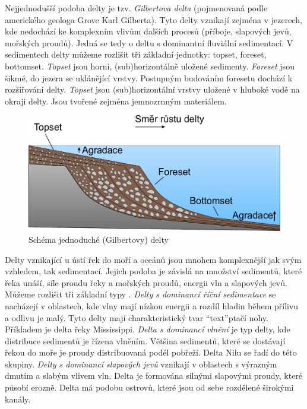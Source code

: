 Nejjednodušší podoba delty je tzv. \emph{Gilbertova delta} (pojmenovaná podle amerického geologa Grove Karl Gilberta). Tyto delty vznikají zejména v jezerech, kde nedochází ke komplexním vlivům dalších procesů (příboje, slapových jevů, mořských proudů). Jedná se tedy o deltu s dominantní fluviální sedimentací. V sedimentech delty můžeme rozlišit tři základní jednotky: topset, foreset, bottomset. \emph{Topset} jsou horní, (sub)horizontálně uložené sedimenty. \emph{Foreset} jsou šikmé, do jezera se uklánějící vrstvy. Postupným budováním foresetu dochází k rozšiřování delty. \emph{Topset} jsou (sub)horizontální vrstvy uložené v hluboké vodě na okraji delty. Jsou tvořené zejména jemnozrnným materiálem.

\begin{figure}[h]
	\centering
	\includegraphics[width=1\linewidth]{obrazky/fluvial/gilbert_delta}
	\caption{Schéma jednoduché (Gilbertovy) delty}
	\label{fig:gilbertdelta}
\end{figure}

Delty vznikající u ústí řek do moří a oceánů jsou mnohem komplexnější jak svým vzhledem, tak sedimentací. Jejich podoba je závislá na množství sedimentů, které řeka unáší, síle proudu řeky a mořských proudů, energii vln a slapových jevů. Můžeme rozlišit tři základní typy \parencite{boggsPrinciplesSedimentologyStratigraphy2014}. \emph{Delty s dominancí říční sedimentace} se nacházejí v oblastech, kde vlny mají nízkou energii a rozdíl hladin během přílivu a odlivu je malý. Tyto delty mají charakteristický tvar \enquote{text}{ptačí nohy}. Příkladem je delta řeky Mississippi. \emph{Delta s dominancí vlnění} je typ delty, kde distribuce sedimentů je řízena vlněním. Většina sedimentů, které se dostávají řekou do moře je proudy distribuovaná podél pobřeží. Delta Nilu se řadí do této skupiny. \emph{Delty s dominancí slapových jevů} vznikají v oblastech s výrazným dmutím a slabým vlivem vln. Delta je formována silnými slapovými proudy, které působí erozně. Delta má podobu ostrovů, které jsou od sebe rozdělené širokými kanály.

